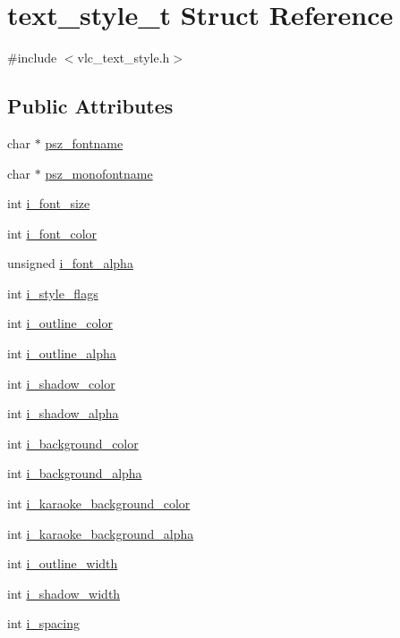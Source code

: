\hypertarget{structtext__style__t}{}\section{text\+\_\+style\+\_\+t Struct Reference}
\label{structtext__style__t}


{\ttfamily \#include $<$vlc\+\_\+text\+\_\+style.\+h$>$}

\subsection*{Public Attributes}
\begin{DoxyCompactItemize}
\item 
char $\ast$ \hyperlink{structtext__style__t_a638ddc05711093db5ce4b05870c19b1e}{psz\+\_\+fontname}
\item 
char $\ast$ \hyperlink{structtext__style__t_a9c58ccd12a4cb539c8547f3f8d2ac007}{psz\+\_\+monofontname}
\item 
int \hyperlink{structtext__style__t_aadf1b22a226a577aa980f35bf5423ac0}{i\+\_\+font\+\_\+size}
\item 
int \hyperlink{structtext__style__t_a5affe9feec6414c59bb1fc362a963ab0}{i\+\_\+font\+\_\+color}
\item 
unsigned \hyperlink{structtext__style__t_a9c75b8f8809919db291b007fa6e931ee}{i\+\_\+font\+\_\+alpha}
\item 
int \hyperlink{structtext__style__t_a5eed3da14743434cdd9f3ad856b0057a}{i\+\_\+style\+\_\+flags}
\item 
int \hyperlink{structtext__style__t_a35f89735e0d56f877ec2c733b3917e49}{i\+\_\+outline\+\_\+color}
\item 
int \hyperlink{structtext__style__t_ac76e87986a24abee8d93e1a1c8c5a22f}{i\+\_\+outline\+\_\+alpha}
\item 
int \hyperlink{structtext__style__t_a3683079cf56fdbb5c90f0289d65eb3b7}{i\+\_\+shadow\+\_\+color}
\item 
int \hyperlink{structtext__style__t_affa114228bf1f3667c702f31b719fb75}{i\+\_\+shadow\+\_\+alpha}
\item 
int \hyperlink{structtext__style__t_ade4abd12624ab5c6c494df602e6c09bf}{i\+\_\+background\+\_\+color}
\item 
int \hyperlink{structtext__style__t_a230dca3f2b2aeebccf9cd913354cb8d1}{i\+\_\+background\+\_\+alpha}
\item 
int \hyperlink{structtext__style__t_aa96cf8501ead619adcdd68ae0725ba1a}{i\+\_\+karaoke\+\_\+background\+\_\+color}
\item 
int \hyperlink{structtext__style__t_a43efb7d518903da3089588ab0e8c7b4b}{i\+\_\+karaoke\+\_\+background\+\_\+alpha}
\item 
int \hyperlink{structtext__style__t_a89567371e6328ab481d3dfefca59693b}{i\+\_\+outline\+\_\+width}
\item 
int \hyperlink{structtext__style__t_a9aff4ee5643cffe0508cdbb867980127}{i\+\_\+shadow\+\_\+width}
\item 
int \hyperlink{structtext__style__t_a2280d36ffa825efb34586276be989ca0}{i\+\_\+spacing}
\end{DoxyCompactItemize}


